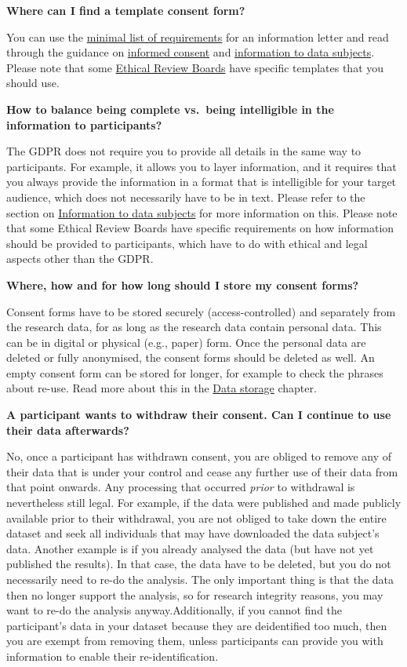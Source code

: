 \documentclass[
]{book}
\begin{document}
\textbf{Where can I find a template consent form?~~~}

You can use the \href{https://www.uu.nl/sites/default/files/RDM_Support_Template_Information_letter.pdf}{minimal list of requirements} for an information letter and read through the guidance on \protect\hyperlink{informed-consent-forms}{informed consent} and \protect\hyperlink{privacy-notices}{information to data subjects}. Please note that some \href{https://intranet.uu.nl/en/knowledgebase/ethics-assessment}{Ethical Review Boards} have specific templates that you should use.

\textbf{How to balance being complete vs.~being intelligible in the information to participants?}

The GDPR does not require you to provide all details in the same way to participants. For example, it allows you to layer information, and it requires that you always provide the information in a format that is intelligible for your target audience, which does not necessarily have to be in text. Please refer to the section on \protect\hyperlink{privacy-notices}{Information to data subjects} for more information on this. Please note that some Ethical Review Boards have specific requirements on how information should be provided to participants, which have to do with ethical and legal aspects other than the GDPR.

\textbf{Where, how and for how long should I store my consent forms?}

Consent forms have to be stored securely (access-controlled) and separately from the research data, for as long as the research data contain personal data. This can be in digital or physical (e.g., paper) form. Once the personal data are deleted or fully anonymised, the consent forms should be deleted as well. An empty consent form can be stored for longer, for example to check the phrases about re-use. Read more about this in the \protect\hyperlink{data-storage}{Data storage} chapter.

\textbf{A participant wants to withdraw their consent. Can I continue to use their data afterwards?}

No, once a participant has withdrawn consent, you are obliged to remove any of their data that is under your control and cease any further use of their data from that point onwards. Any processing that occurred \emph{prior} to withdrawal is nevertheless still legal. For example, if the data were published and made publicly available prior to their withdrawal, you are not obliged to take down the entire dataset and seek all individuals that may have downloaded the data subject's data. Another example is if you already analysed the data (but have not yet published the results). In that case, the data have to be deleted, but you do not necessarily need to re-do the analysis. The only important thing is that the data then no longer support the analysis, so for research integrity reasons, you may want to re-do the analysis anyway.Additionally, if you cannot find the participant's data in your dataset because they are deidentified too much, then you are exempt from removing them, unless participants can provide you with information to enable their re-identification.
\end{document}
